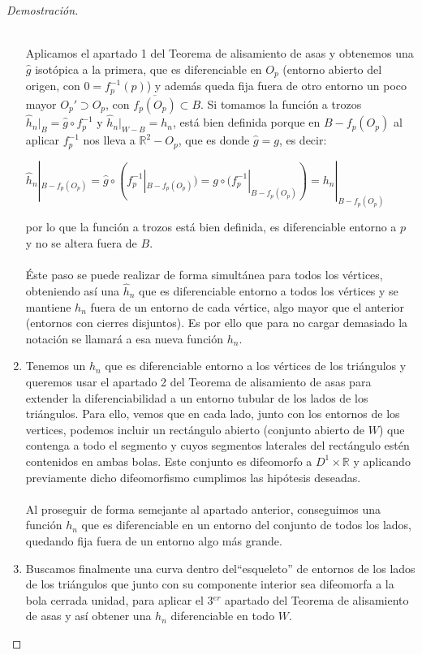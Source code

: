 \begin{proof}[Demostración]
\begin{enumerate}
			\\ Aplicamos el apartado 1 del Teorema de alisamiento de asas y obtenemos una $\widehat{g}$ isotópica a la primera, que es diferenciable en $O_p$ (entorno abierto del origen, con $0=f_p^{-1}(p)$) y además queda fija fuera de otro entorno un poco mayor $O_p'\supset O_p$, con $\overline{f_p(O_p)}\subset B $. Si tomamos la función a trozos $\widehat{h}_n|_{B}=\widehat{g}\circ f_p^{-1}$ y $\widehat{h}_n|_{W-B}=h_n$, está bien definida porque en $B-f_p(O_p)$ al aplicar $f_p^{-1}$ nos lleva a $\mathbb{R}^2-O_p$, que es donde $\widehat{g}=g$, es decir: \\
			\begin{center}
				$\widehat{h}_n|_{B-f_p(O_p)}=\widehat{g}\circ(f_p^{-1}|_{B-f_p(O_p)})=g\circ(f_p^{-1}|_{B-f_p(O_p)})=h_n|_{B-f_p(O_p)}$\\
			\end{center}
			por lo que la función a trozos está bien definida, es diferenciable entorno a $p$ y no se altera fuera de $B$. \\
			\\ Éste paso se puede realizar de forma simultánea para todos los vértices, obteniendo así una $\widehat{h}_n$ que es diferenciable entorno a todos los vértices y se mantiene $h_n$ fuera de un entorno de cada vértice, algo mayor que el anterior (entornos con cierres disjuntos). Es por ello que para no cargar demasiado la notación se llamará a esa nueva función $h_n$.
			\item Tenemos un $h_n$ que es diferenciable entorno a los vértices de los triángulos y queremos usar el apartado 2 del Teorema de alisamiento de asas para extender la diferenciabilidad a un entorno tubular de los lados de los triángulos. Para ello, vemos que en cada lado, junto con los entornos de los vertices, podemos incluir un rectángulo abierto (conjunto abierto de $W$) que contenga a todo el segmento y cuyos segmentos laterales del rectángulo estén contenidos en ambas bolas. Este conjunto es difeomorfo a $D^1 \times \mathbb{R}$ y aplicando previamente dicho difeomorfismo cumplimos las hipótesis deseadas.\\
			\\ Al proseguir de forma semejante al apartado anterior, conseguimos una función $h_n$ que es diferenciable en un entorno del conjunto de todos los lados, quedando fija fuera de un entorno algo más grande.
			\item Buscamos finalmente una curva dentro del``esqueleto'' de entornos de los lados de los triángulos que junto con su componente interior sea difeomorfa a la bola cerrada unidad, para aplicar el 3$^{er}$ apartado del Teorema de alisamiento de asas y así obtener una $h_n$ diferenciable en todo $W$.\\

\end{enumerate}
\end{proof}
